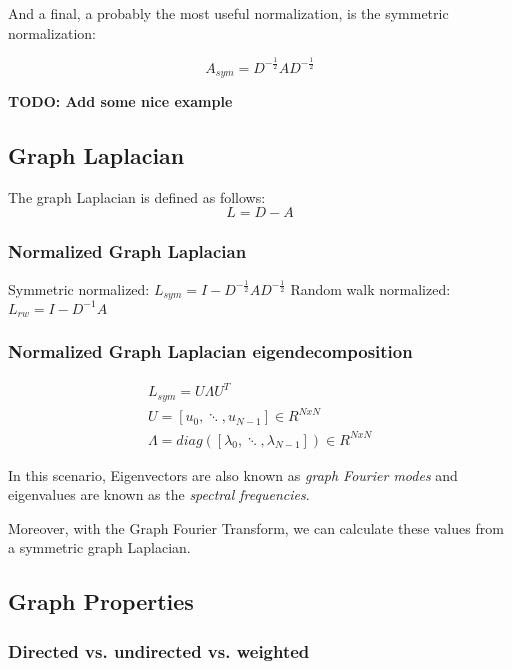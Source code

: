 And a final, a probably the most useful normalization, is the symmetric normalization:

\begin{equation}
    A_{sym} =  D^{-\frac{1}{2}} A D^{-\frac{1}{2}}
\end{equation}

\textbf{TODO: Add some nice example}

\subsection{Graph Laplacian}
The graph Laplacian is defined as follows:
\begin{equation}
    L = D - A
\end{equation}


\subsubsection{Normalized Graph Laplacian}

Symmetric normalized: $L_{sym} = I - D^{-\frac{1}{2}} A D^{-\frac{1}{2}}$
Random walk normalized: $L_{rw} = I - D^{-1} A$

\subsubsection{Normalized Graph Laplacian eigendecomposition}

\begin{equation}
    \begin{aligned}
        L_{sym} =U \Lambda U^T \\
        U = [u_0, \ddots, u_{N-1}] \in R^{N x N}\\
        \Lambda = diag ( [\lambda_0, \ddots, \lambda_{N-1}] ) \in R^{N x N}
    \end{aligned}
\end{equation}

In this scenario, Eigenvectors are also known as \textit{graph Fourier modes}
and eigenvalues are known as the \textit{spectral frequencies}.

Moreover, with the Graph Fourier Transform, we can calculate these values from a symmetric
graph Laplacian.

\subsection{Graph Properties}

\subsubsection{Directed vs. undirected vs. weighted}

